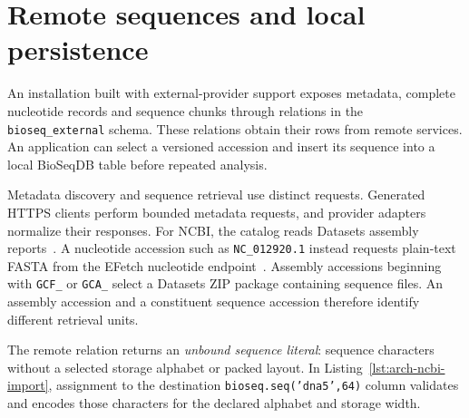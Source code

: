 \section{Remote sequences and local persistence}
\label{sec:arch-remote-sequences}

An installation built with external-provider support exposes metadata,
complete nucleotide records and sequence chunks through relations in the
\texttt{bioseq\_external} schema. These relations obtain their rows from remote
services. An application can select a versioned accession and insert its
sequence into a local BioSeqDB table before repeated analysis.

Metadata discovery and sequence retrieval use distinct requests. Generated
HTTPS clients perform bounded metadata requests, and provider adapters
normalize their responses. For NCBI, the catalog reads Datasets assembly
reports~\autocite{ncbi_datasets_v2_api}. A nucleotide accession such as
\texttt{NC\_012920.1} instead requests plain-text FASTA from the EFetch
nucleotide endpoint~\autocite{ncbiEutilities}.
Assembly accessions beginning with \texttt{GCF\_} or \texttt{GCA\_} select a
Datasets ZIP package containing sequence files. An assembly accession and a
constituent sequence accession therefore identify different retrieval units.

The remote relation returns an \emph{unbound sequence literal}: sequence
characters without a selected storage alphabet or packed layout. In
Listing~\ref{lst:arch-ncbi-import}, assignment to the destination
\texttt{bioseq.seq('dna5',64)} column validates and encodes those characters
for the declared alphabet and storage width.

